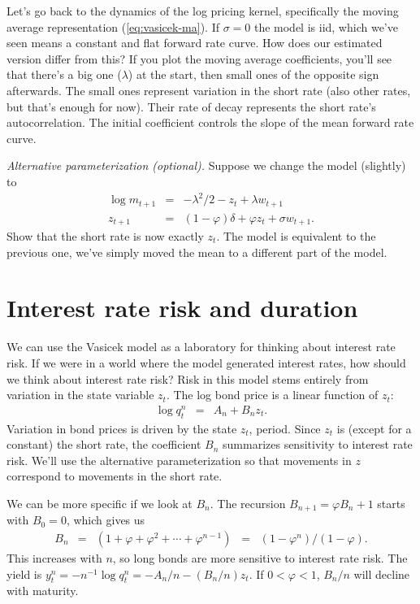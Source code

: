 \documentclass[11pt]{article}
\begin{document}
Let's go back to the dynamics of the log pricing kernel,
specifically the moving average representation (\ref{eq:vasicek-ma}).
If $\sigma = 0$ the model is iid, which we've seen means a
constant and flat forward rate curve.
How does our estimated version differ from this?
If you plot the moving average coefficients,
you'll see that there's a big one ($\lambda$) at the start,
then small ones of the opposite sign afterwards.
The small ones represent variation in the short rate
(also other rates, but that's enough for now).
Their rate of decay represents the short rate's autocorrelation.
The initial coefficient controls the slope of the mean forward rate
curve.


{\it Alternative parameterization (optional).\/}
Suppose we change the model (slightly) to
\begin{eqnarray*}
    \log m_{t+1} &=& - \lambda^2/2 - z_t + \lambda w_{t+1} \\
         z_{t+1} &=& (1-\varphi) \delta + \varphi z_t + \sigma w_{t+1} .
\end{eqnarray*}
Show that the short rate is now exactly $z_t$.
The model is equivalent to the previous one,
we've simply moved the mean to a different part of the model.


\section{Interest rate risk and duration}

We can use the Vasicek model as a laboratory for thinking about interest rate risk.
If we were in a world where the model generated interest rates,
how should we think about interest rate risk?
Risk in this model stems entirely from variation in the state variable $z_t$.
The log bond price is a linear function of $z_t$:
\begin{eqnarray*}
    \log q^n_t &=& A_n + B_n z_t .
\end{eqnarray*}
Variation in bond prices is driven by the state $z_t$, period.
Since $z_t$ is (except for a constant) the short rate,
the coefficient $B_n$ summarizes sensitivity to interest rate risk.
We'll use the alternative parameterization so that movements in $z$
correspond to movements in the short rate.

We can be more specific if we look at $B_n$.
The recursion $B_{n+1} = \varphi B_n + 1$ starts with $B_0 = 0$,
which gives us
\begin{eqnarray*}
    B_n &=& (1 + \varphi + \varphi^2 + \cdots + \varphi^{n-1})
            \;\;=\;\; (1-\varphi^n)/(1-\varphi) .
\end{eqnarray*}
This increases with $n$, so long bonds are more sensitive to interest rate risk.
The yield is $y^n_t = -n^{-1} \log q^n_t = - A_n/n - (B_n/n) z_t$.
If $0 < \varphi < 1$,
$B_n/n$ will decline with maturity.
\end{document}
